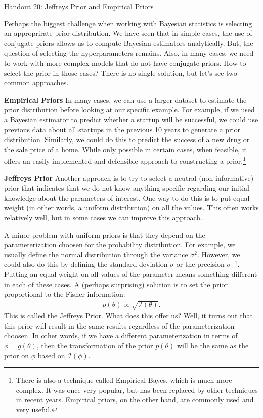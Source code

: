 \documentclass{tufte-handout}
\begin{document}
\justify

{\LARGE Handout 20: Jeffreys Prior and Empirical Priors}

\vspace*{18pt}

\noindent
Perhaps the biggest challenge when working with Bayesian statistics
is selecting an approprirate prior distribution. We have seen that
in simple cases, the use of conjugate priors allows us to compute
Bayesian estimators analytically. But, the question of selecting
the hyperparameters remains. Also, in many cases, we need to work
with more complex models that do not have conjugate priors. How to
select the prior in those cases? There is no single solution, but
let's see two common approaches.

\vspace*{8pt}

\noindent
\textbf{Empirical Priors} In many cases, we can use a larger dataset
to estimate the prior distribution before looking at our specific
example. For example, if we used a Bayesian estimator to predict
whether a startup will be successful, we could use previous data 
about all startups in the previous 10 years to generate a prior
distribution. Similarly, we could do this to predict the success 
of a new drug or the sale price of a home. While
only possible in certain cases, when feasible, it offers an easily
implemented and defensible approach to constructing a prior.\footnote{
  There is also a technique called Empirical Bayes, which is much
  more complex. It was once very popular, but has been replaced by
  other techniques in recent years. Empirical priors, on the other
  hand, are commonly used and very useful.
}

\vspace*{8pt}

\noindent
\textbf{Jeffreys Prior} Another approach is to try to select a 
neutral (non-informative) prior that indicates that we do not know
anything specific regarding our initial knowledge about the parameters
of interest. One way to do this is to put equal weight (in other words,
a uniform distribution) on all the values. This often works relatively
well, but in some cases we can improve this approach.

A minor problem with uniform priors is that they depend on the parameterization
choosen for the probability distribution. For example, we usually define
the normal distribution through the variance $\sigma^2$. However, we could
also do this by defining the standard deviation $\sigma$ or the precision
$\sigma^{-1}$. Putting an equal weight on all
values of the parameter means something different in each of these cases.
A (perhaps surprising) solution is to set the prior proportional to the Fisher
information:
\begin{align*}
p(\theta) \propto \sqrt{\mathcal{I}(\theta)}.
\end{align*}
This is called the Jeffreys Prior.
What does this offer us? Well, it turns out that this prior will result in
the same results regardless of the parameterization choosen. In other words,
if we have a different parameterization in terms of $\phi = g(\theta)$, then
the transformation of the prior $p(\theta)$ will be the same as the prior
on $\phi$ based on $\mathcal{I}(\phi)$. 
\end{document}
